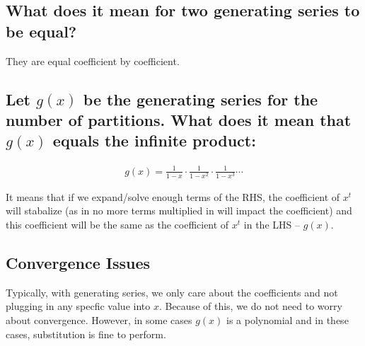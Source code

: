 \documentclass{report}
\begin{document}

\subsection*{What does it mean for two generating series to be equal?}

They are equal coefficient by coefficient.

\subsection*{Let $g(x)$ be the generating series for the number of partitions.
    What does it mean that $g(x)$ equals the infinite product:
}

\begin{align*}
    g(x) = \frac{1}{1 - x} \cdot \frac{1}{1 - x^{2}} \cdot \frac{1}{1 - x^{3}} \cdots
\end{align*}

It means that if we expand/solve enough terms of the RHS, the coefficient
of $x^t$ will stabalize (as in no more terms multiplied in will impact
the coefficient) and this coefficient will be the same as the coefficient
of $x^t$ in the LHS -- $g(x)$.

\subsection*{Convergence Issues}

Typically, with generating series, we only care about the coefficients and
not plugging in any specfic value into $x$. Because of this, we do not need
to worry about convergence. However, in some cases $g(x)$ is a polynomial
and in these cases, substitution is fine to perform.
\end{document}
